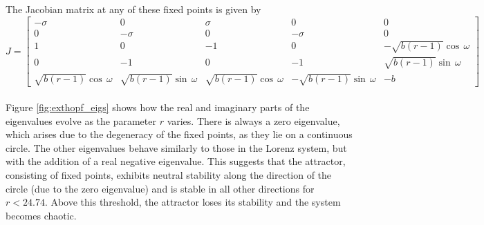 \documentclass[paper=a4, fontsize=11pt]{scrartcl}
\numberwithin{equation}{section}		%
\numberwithin{figure}{section}			%
\numberwithin{table}{section}				%
\begin{document}
\noindent The Jacobian matrix at any of these fixed points is given by
\begin{equation}
J = \begin{bmatrix}
	-\sigma & 0 & \sigma & 0 & 0 \\
	0 & -\sigma & 0 & -\sigma & 0 \\
	1 & 0 & -1 & 0 & -\sqrt{b (r - 1)} \cos \, \omega \\
	0 & -1 & 0 & -1 & \sqrt{b (r - 1)} \sin \, \omega \\
	\sqrt{b (r - 1)} \cos \, \omega & \sqrt{b (r - 1)} \sin \, \omega & \sqrt{b (r - 1)} \cos \, \omega & -\sqrt{b (r - 1)} \sin \, \omega & -b
\end{bmatrix}
\end{equation}\\

Figure \ref{fig:exthopf_eigs} shows how the real and imaginary parts of the eigenvalues evolve as the parameter $r$ varies. There is always a zero eigenvalue, which arises due to the degeneracy of the fixed points, as they lie on a continuous circle. The other eigenvalues behave similarly to those in the Lorenz system, but with the addition of a real negative eigenvalue. This suggests that the attractor, consisting of fixed points, exhibits neutral stability along the direction of the circle (due to the zero eigenvalue) and is stable in all other directions for $r < 24.74$. Above this threshold, the attractor loses its stability and the system becomes chaotic.\\
\end{document}
